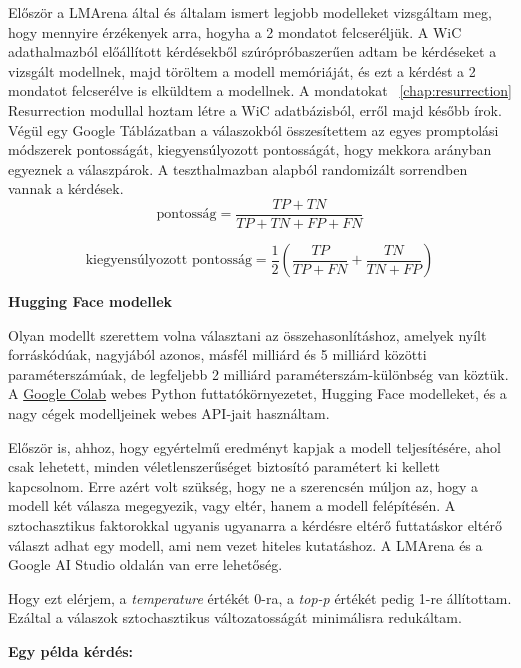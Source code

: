 \documentclass[12pt]{report}
\theoremstyle{definition}
\begin{document}
Először a LMArena által és általam ismert legjobb modelleket vizsgáltam meg, hogy mennyire érzékenyek arra, hogyha a 2 mondatot felcseréljük. A WiC adathalmazból előállított kérdésekből szúrópróbaszerűen adtam be kérdéseket a vizsgált modellnek, majd töröltem a modell memóriáját, és ezt a kérdést a 2 mondatot felcserélve is elküldtem a modellnek. A mondatokat ~\ref{chap:resurrection} Resurrection modullal hoztam létre a WiC adatbázisból, erről majd később írok. Végül egy Google Táblázatban a válaszokból összesítettem az egyes promptolási módszerek pontosságát, kiegyensúlyozott pontosságát, hogy mekkora arányban egyeznek a válaszpárok. A teszthalmazban alapból randomizált sorrendben vannak a kérdések.
\begin{equation}
    \text{pontosság} = \frac{TP + TN}{TP + TN + FP + FN}
\end{equation}
\vspace*{0.5cm}

\begin{equation}
	\text{kiegyensúlyozott pontosság} = \frac{1}{2} \left( \frac{TP}{TP + FN} + \frac{TN}{TN + FP} \right)
\end{equation}
\vspace*{0.5cm}


  {\large\bf Hugging Face modellek}

Olyan modellt szerettem volna választani az összehasonlításhoz, amelyek nyílt forráskódúak, nagyjából azonos, másfél milliárd és 5 milliárd közötti paraméterszámúak, de legfeljebb 2 milliárd paraméterszám-különbség van köztük. A \href{https://colab.research.google.com/}{Google Colab} webes Python futtatókörnyezetet, Hugging Face modelleket, és a nagy cégek modelljeinek webes API-jait használtam.

Először is, ahhoz, hogy egyértelmű eredményt kapjak a modell teljesítésére, ahol csak lehetett, minden véletlenszerűséget biztosító paramétert ki kellett kapcsolnom. Erre azért volt szükség, hogy ne a szerencsén múljon az, hogy a modell két válasza megegyezik, vagy eltér, hanem a modell felépítésén. A sztochasztikus faktorokkal ugyanis ugyanarra a kérdésre eltérő futtatáskor eltérő választ adhat egy modell, ami nem vezet hiteles kutatáshoz. A LMArena és a Google AI Studio oldalán van erre lehetőség.

Hogy ezt elérjem, a \textit{temperature} értékét 0-ra, a \textit{top-p} értékét pedig 1-re állítottam. Ezáltal a válaszok sztochasztikus változatosságát minimálisra redukáltam.


{\large\bf Egy példa kérdés:}
\end{document}
